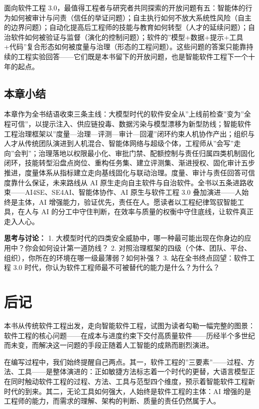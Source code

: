 \documentclass[
]{ctexbook}
\begin{document}
面向软件工程
3.0，最值得工程者与研究者共同探索的开放问题有五：智能体的行为如何被审计与问责（信任的举证问题）；自主执行如何不放大系统性风险（自主的边界问题）；自动化提高后工程师的技能与教育如何转型（人才的延续问题）；自治软件如何被验证与监督（演化的控制问题）；软件的''模型+数据+提示+工具+代码''复合形态如何被度量与治理（形态的工程问题）。这些问题的答案只能靠持续的工程实验回答------它们既是本书留下的开放问题，也是智能软件工程下一个十年的起点。

\section{本章小结}\label{ux672cux7ae0ux5c0fux7ed3-15}

本章作为全书结语收束三条主线：大模型时代的软件安全从''上线前检查''变为''全程可信''，以提示注入、供应链投毒、数据污染与模型漂移为新型防线；智能软件工程治理框架以''度量---治理---评测---审计---回灌''闭环约束人机协作产出；组织与人才从传统团队演进到人机混合、智能体网络与超级个体，工程师从''会写''走向''会判''；治理落地以权限最小化、审批门禁、配额控制与责任归属四类机制固化闭环，技能转型沿盘点岗位、重构任务集、建立评测集、渐进授权、固化审计五步推进，度量体系从指标建立走向基线固化与联动治理。度量、审计与责任回答可信度靠什么保证，未来路线从
AI
原生走向自主软件与自治软件。全书以五条进路收束------AI4SE、SE4AI、智能体协作、AI
原生与软件工程 3.0 叠加演进------人始终是主体，AI
增强能力，验证优先，责任在人。愿读者以工程纪律驾驭智能工具，在人与 AI
的分工中守住判断，在效率与质量的权衡中守住底线，让软件真正走入人心。

\textbf{思考与讨论：} 1.
大模型时代的四类安全威胁中，哪一种最可能出现在你身边的应用中？你会如何设计第一道防线？
2.
对照治理框架的四级（个体、团队、平台、组织），你所在的环境在哪一级最薄弱？如何补强？
3. 站在全书终点回望：软件工程 3.0
时代，你认为软件工程师最不可被替代的能力是什么？为什么？

\chapter*{后记}\label{ux540eux8bb0}

本书从传统软件工程出发，走向智能软件工程，试图为读者勾勒一幅完整的图景：软件工程的核心问题------在成本与进度约束下交付高质量软件------历经半个多世纪而未变，而解决这一问题的手段正随着人工智能的成熟而剧烈演进。

在编写过程中，我们始终提醒自己两点。其一，软件工程的''三要素''------过程、方法、工具------是整体演进的：正如敏捷方法标志着一个时代的更替，大语言模型正在同时触动软件工程的过程、方法、工具与范型四个维度，预示着智能软件工程新时代的到来。其二，无论工具如何强大，人始终是软件工程的主体：AI
增强的是工程师的能力，而需求的理解、架构的判断、质量的责任仍然属于人。
\end{document}
